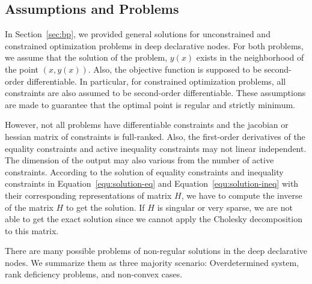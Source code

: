 \subsection{Assumptions and Problems}
In Section~\ref{sec:bp}, we provided general solutions for unconstrained and constrained optimization problems in deep declarative nodes. For both problems, we assume that the solution of the problem, $y(x)$ exists in the neighborhood of the point $(x, y(x))$. Also, the objective function is supposed to be second-order differentiable. In particular, for constrained optimization problems, all constraints are also assumed to be second-order differentiable. These assumptions are made to guarantee that the optimal point is regular and strictly minimum. 
\par However, not all problems have differentiable constraints and the jacobian or hessian matrix of constraints is full-ranked. Also, the first-order derivatives of the equality constraints and active inequality constraints may not linear independent. The dimension of the output may also various from the number of active constraints. According to the solution of equality constraints and inequality constraints in Equation~\ref{equ:solution-eq} and Equation~\ref{equ:solution-ineq} with their corresponding representations of matrix $H$, we have to compute the inverse of the matrix $H$ to get the solution. If $H$ is singular or very sparse, we are not able to get the exact solution since we cannot apply the Cholesky decomposition to this matrix. 
\par There are many possible problems of non-regular solutions in the deep declarative nodes. We summarize them as three majority scenario: Overdetermined system, rank deficiency problems, and non-convex cases. 


